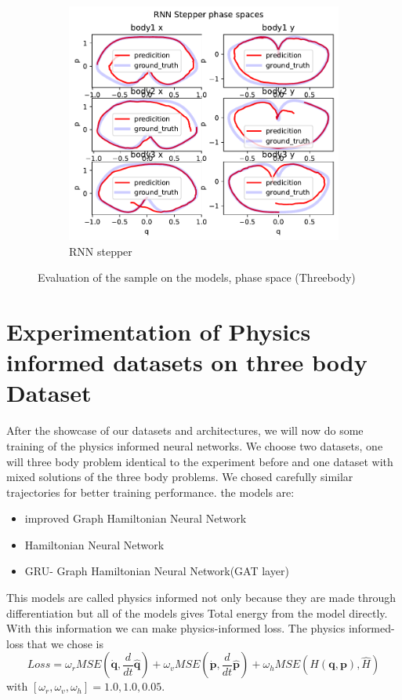 \begin{figure}[H]
	\hfill
	\begin{subfigure}[b]{0.3\textwidth}
		\centering
		\includegraphics[width=\textwidth]{chapters/chapter5/body3_rne_ps.pdf}
		\caption{RNN stepper}
	\end{subfigure}
	
	\caption{Evaluation of the sample on the models, phase space (Threebody)}
	\label{body3_ps}
\end{figure} 




\section{Experimentation of Physics informed datasets on three body Dataset}
After the showcase of our datasets and architectures, we will now do some training of the physics informed neural networks. We choose two datasets, one will three body problem identical to the experiment before and one dataset with mixed solutions of the three body problems. We chosed carefully similar trajectories for better training performance. 
the models are:
\begin{itemize}
	\item improved Graph Hamiltonian Neural Network
	\item Hamiltonian Neural Network
	\item GRU- Graph Hamiltonian Neural Network(GAT layer)
\end{itemize}
This models are called physics informed not only because they are made through differentiation but all of the models gives Total energy from the model directly. With this information we can make physics-informed loss. 
The physics informed-loss that we chose is
\begin{equation}
	Loss =  \omega_rMSE(\dot{\mathbf{q}},\frac{d}{dt}\hat{\mathbf{q}}) + \omega_v MSE(\dot{\mathbf{p}},\frac{d}{dt}\hat{\mathbf{p}}) +
	\omega_h MSE(H(\mathbf{q},\mathbf{p}),\hat{H}) 
\end{equation} with $[\omega_r,\omega_v,\omega_h] =1.0,1.0,0.05$.

